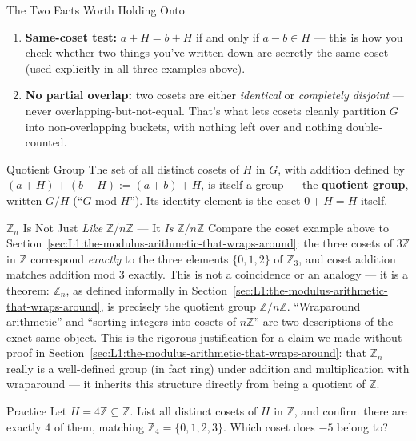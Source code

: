 \begin{rmkbox}{The Two Facts Worth Holding Onto}
\begin{enumerate}[leftmargin=*]
  \item \textbf{Same-coset test:} $a+H = b+H$ if and only if $a-b \in H$ --- this is how you check whether two things you've written down are secretly the same coset (used explicitly in all three examples above).
  \item \textbf{No partial overlap:} two cosets are either \emph{identical} or \emph{completely disjoint} --- never overlapping-but-not-equal. That's what lets cosets cleanly partition $G$ into non-overlapping buckets, with nothing left over and nothing double-counted.
\end{enumerate}
\end{rmkbox}

\begin{defbox}{Quotient Group}
The set of all distinct cosets of $H$ in $G$, with addition defined by $(a+H) + (b+H) := (a+b) + H$, is itself a group --- the \textbf{quotient group}, written $G/H$ (``$G$ mod $H$''). Its identity element is the coset $0 + H = H$ itself.
\end{defbox}

\begin{rmkbox}{$\mathbb{Z}_n$ Is Not Just \emph{Like} $\mathbb{Z}/n\mathbb{Z}$ --- It \emph{Is} $\mathbb{Z}/n\mathbb{Z}$}
Compare the coset example above to Section~\ref{sec:L1:the-modulus-arithmetic-that-wraps-around}: the three cosets of $3\mathbb{Z}$ in $\mathbb{Z}$ correspond \emph{exactly} to the three elements $\{0,1,2\}$ of $\mathbb{Z}_3$, and coset addition matches addition mod $3$ exactly. This is not a coincidence or an analogy --- it is a theorem: $\mathbb{Z}_n$, as defined informally in Section~\ref{sec:L1:the-modulus-arithmetic-that-wraps-around}, is precisely the quotient group $\mathbb{Z}/n\mathbb{Z}$. ``Wraparound arithmetic'' and ``sorting integers into cosets of $n\mathbb{Z}$'' are two descriptions of the exact same object. This is the rigorous justification for a claim we made without proof in Section~\ref{sec:L1:the-modulus-arithmetic-that-wraps-around}: that $\mathbb{Z}_n$ really is a well-defined group (in fact ring) under addition and multiplication with wraparound --- it inherits this structure directly from being a quotient of $\mathbb{Z}$.
\end{rmkbox}

\begin{exercisebox}{Practice}
Let $H = 4\mathbb{Z} \subseteq \mathbb{Z}$. List all distinct cosets of $H$ in $\mathbb{Z}$, and confirm there are exactly $4$ of them, matching $\mathbb{Z}_4 = \{0,1,2,3\}$. Which coset does $-5$ belong to?
\end{exercisebox}

